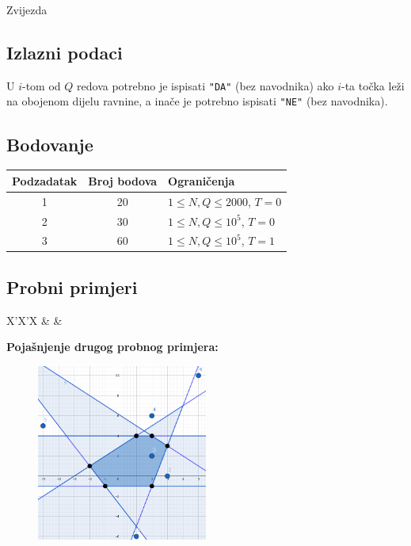 \begin{statement}[
  problempoints=110,
  timelimit=1 sekunda,
  memorylimit=512 MiB,
]{Zvijezda}
\subsection*{Izlazni podaci}
U $i$-tom od $Q$ redova potrebno je ispisati \texttt{"DA"} (bez navodnika) ako
$i$-ta točka leži na obojenom dijelu ravnine, a inače je potrebno ispisati
\texttt{"NE"} (bez navodnika).

\subsection*{Bodovanje}
{\renewcommand{\arraystretch}{1.4}
  \setlength{\tabcolsep}{6pt}
  \begin{tabular}{ccl}
 Podzadatak & Broj bodova & Ograničenja \\ \midrule
  1 & 20 & $1 \le N, Q \le 2000$, $T = 0$ \\
  2 & 30 & $1 \le N, Q \le 10^5$, $T = 0$ \\
  3 & 60 & $1 \le N, Q \le 10^5$, $T = 1$
\end{tabular}}

\subsection*{Probni primjeri}
\begin{tabularx}{\textwidth}{X'X'X}
 &
 &
\end{tabularx}

\textbf{Pojašnjenje drugog probnog primjera:}
\begin{figure}[H]
\centering
\includegraphics[width=0.5\textwidth]{img/zvijezda_clar.png}
\end{figure}


\end{statement}
